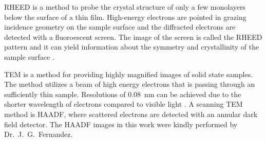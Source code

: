 \gls{RHEED} is a method to probe the crystal structure of only a few monolayers below the surface of a thin film.
High-energy electrons are pointed in grazing incidence geometry on the sample surface and the diffracted electrons are detected with a fluoroescent screen.
The image of the screen is called the RHEED pattern and it can yield information about the symmetry and crystallinity of the sample surface
    \cite{hafez2022}.

\gls{TEM} is a method for providing highly magnified images of solid state samples.
The method utilizes a beam of high energy electrons that is passing through an sufficiently thin sample.
Resolutions of \qty{0.08}{\nm} can be achieved due to the shorter wavelength of electrons compared to visible light
    \cite{schroder2005}.
A scanning \acrshort{TEM} method is \gls{HAADF}, where scattered electrons are detected with an annular dark field detector.
The \acrshort{HAADF} images in this work were kindly performed by Dr.\ J.\ G.\  Fernandez.